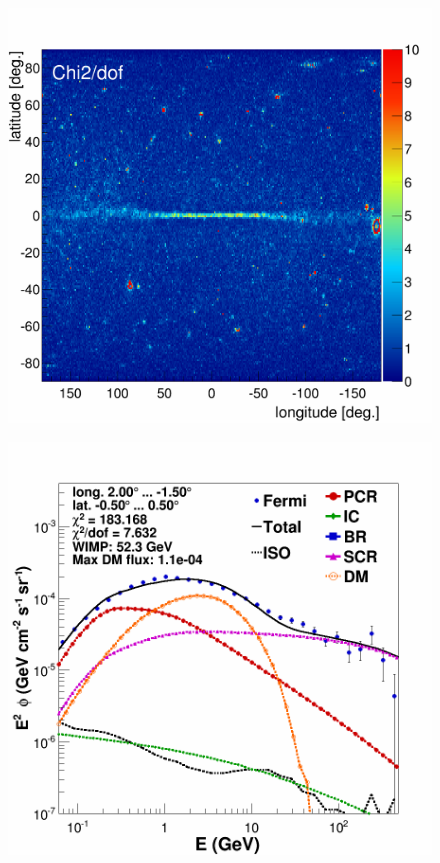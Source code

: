\begin{figure}[H]
\begin{minipage}[h]{0.45\textwidth}
	\subcaption{}
  	\label{fig:MCRonly_CMZ}
  \end{minipage}
  \hfill
  \begin{minipage}[h]{0.45\textwidth}
  	\centering
	\includegraphics[width=1\linewidth]{pic/results/DMonly_fine_chi2_distribution.png}
  	\subcaption{}
  \label{fig:DMonly_chi2Distribution}
  \end{minipage}
  \hfill
  \begin{minipage}[h]{0.45\textwidth}
  	\centering
	\includegraphics[width=1\linewidth]{pic/results/DMonly_CMZ.png}

\end{minipage}
\end{figure}
